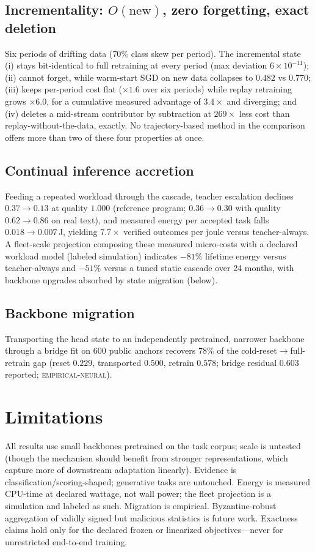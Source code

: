 \documentclass[11pt]{article}
\begin{document}
\subsection{Incrementality: $O(\mathrm{new})$, zero forgetting, exact deletion}
Six periods of drifting data ($70\%$ class skew per period). The
incremental state (i) stays bit-identical to full retraining at every
period (max deviation $6\times10^{-11}$); (ii) cannot forget, while
warm-start SGD on new data collapses to $0.482$ vs $0.770$; (iii) keeps
per-period cost flat ($\times1.6$ over six periods) while replay
retraining grows $\times6.0$, for a cumulative measured advantage of
$3.4\times$ and diverging; and (iv) deletes a mid-stream contributor by
subtraction at $269\times$ less cost than replay-without-the-data,
exactly. No trajectory-based method in the comparison offers more than
two of these four properties at once.

\subsection{Continual inference accretion}
Feeding a repeated workload through the cascade, teacher escalation
declines $0.37\!\to\!0.13$ at quality $1.000$ (reference program;
$0.36\!\to\!0.30$ with quality $0.62\!\to\!0.86$ on real text), and
measured energy per accepted task falls $0.018\!\to\!0.007$\,J,
yielding $7.7\times$ verified outcomes per joule versus teacher-always.
A fleet-scale projection composing these measured micro-costs with a
declared workload model (labeled simulation) indicates $-81\%$ lifetime
energy versus teacher-always and $-51\%$ versus a tuned static cascade
over 24 months, with backbone upgrades absorbed by state migration
(below).

\subsection{Backbone migration}
Transporting the head state to an independently pretrained,
narrower backbone through a bridge fit on 600 public anchors recovers
$78\%$ of the cold-reset$\to$full-retrain gap
(reset $0.229$, transported $0.500$, retrain $0.578$;
bridge residual $0.603$ reported; \textsc{empirical-neural}).

\section{Limitations}
All results use small backbones pretrained on the task corpus; scale is
untested (though the mechanism should benefit from stronger
representations, which capture more of downstream adaptation linearly).
Evidence is classification/scoring-shaped; generative tasks are
untouched. Energy is measured CPU-time at declared wattage, not wall
power; the fleet projection is a simulation and labeled as such.
Migration is empirical. Byzantine-robust aggregation of validly signed
but malicious statistics is future work. Exactness claims hold only for
the declared frozen or linearized objectives---never for unrestricted
end-to-end training.
\end{document}
